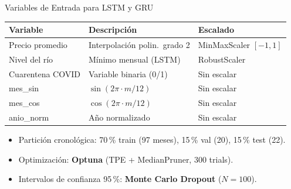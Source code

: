 \documentclass[12pt, aspectratio=169]{beamer}
\begin{document}
\begin{frame}{Variables de Entrada para LSTM y GRU}
\begin{table}[ht]
\centering
\small
\begin{tabular}{lll}
\toprule
\textbf{Variable} & \textbf{Descripci\'on} & \textbf{Escalado} \\
\midrule
Precio promedio & Interpolaci\'on polin.\ grado 2 & MinMaxScaler $[-1,1]$ \\
Nivel del r\'io & M\'inimo mensual (LSTM) & RobustScaler \\
Cuarentena COVID & Variable binaria (0/1) & Sin escalar \\
mes\_sin & $\sin(2\pi \cdot m/12)$ & Sin escalar \\
mes\_cos & $\cos(2\pi \cdot m/12)$ & Sin escalar \\
anio\_norm & A\~no normalizado & Sin escalar \\
\bottomrule
\end{tabular}
\end{table}

\vspace{0.2cm}
\begin{itemize}
  \item Partici\'on cronol\'ogica: 70\,\% train (97 meses), 15\,\% val (20), 15\,\% test (22).
  \item Optimizaci\'on: \textbf{Optuna} (TPE + MedianPruner, 300 trials).
  \item Intervalos de confianza 95\,\%: \textbf{Monte Carlo Dropout} ($N=100$).
\end{itemize}
\end{frame}
\end{document}
